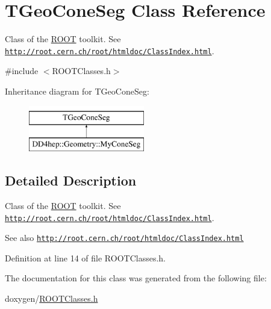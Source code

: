 \hypertarget{class_t_geo_cone_seg}{}\section{T\+Geo\+Cone\+Seg Class Reference}
\label{class_t_geo_cone_seg}


Class of the \hyperlink{namespace_r_o_o_t}{R\+O\+OT} toolkit. See \href{http://root.cern.ch/root/htmldoc/ClassIndex.html}{\tt http\+://root.\+cern.\+ch/root/htmldoc/\+Class\+Index.\+html}.  




{\ttfamily \#include $<$R\+O\+O\+T\+Classes.\+h$>$}

Inheritance diagram for T\+Geo\+Cone\+Seg\+:\begin{figure}[H]
\begin{center}
\leavevmode
\includegraphics[height=2.000000cm]{class_t_geo_cone_seg}
\end{center}
\end{figure}


\subsection{Detailed Description}
Class of the \hyperlink{namespace_r_o_o_t}{R\+O\+OT} toolkit. See \href{http://root.cern.ch/root/htmldoc/ClassIndex.html}{\tt http\+://root.\+cern.\+ch/root/htmldoc/\+Class\+Index.\+html}. 

\begin{DoxySeeAlso}{See also}
\href{http://root.cern.ch/root/htmldoc/ClassIndex.html}{\tt http\+://root.\+cern.\+ch/root/htmldoc/\+Class\+Index.\+html} 
\end{DoxySeeAlso}


Definition at line 14 of file R\+O\+O\+T\+Classes.\+h.



The documentation for this class was generated from the following file\+:\begin{DoxyCompactItemize}
\item 
doxygen/\hyperlink{_r_o_o_t_classes_8h}{R\+O\+O\+T\+Classes.\+h}\end{DoxyCompactItemize}
